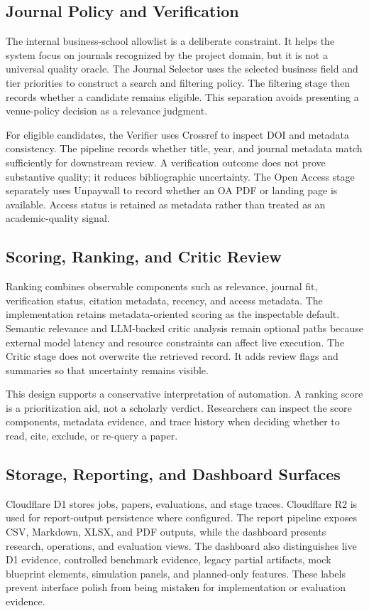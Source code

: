 \documentclass[10pt,twocolumn]{article}
\begin{document}
\subsection{Journal Policy and Verification}
The internal business-school allowlist is a deliberate constraint. It helps the system focus on journals recognized by the project domain, but it is not a universal quality oracle. The Journal Selector uses the selected business field and tier priorities to construct a search and filtering policy. The filtering stage then records whether a candidate remains eligible. This separation avoids presenting a venue-policy decision as a relevance judgment.

For eligible candidates, the Verifier uses Crossref to inspect DOI and metadata consistency. The pipeline records whether title, year, and journal metadata match sufficiently for downstream review. A verification outcome does not prove substantive quality; it reduces bibliographic uncertainty. The Open Access stage separately uses Unpaywall to record whether an OA PDF or landing page is available. Access status is retained as metadata rather than treated as an academic-quality signal.

\subsection{Scoring, Ranking, and Critic Review}
Ranking combines observable components such as relevance, journal fit, verification status, citation metadata, recency, and access metadata. The implementation retains metadata-oriented scoring as the inspectable default. Semantic relevance and LLM-backed critic analysis remain optional paths because external model latency and resource constraints can affect live execution. The Critic stage does not overwrite the retrieved record. It adds review flags and summaries so that uncertainty remains visible.

This design supports a conservative interpretation of automation. A ranking score is a prioritization aid, not a scholarly verdict. Researchers can inspect the score components, metadata evidence, and trace history when deciding whether to read, cite, exclude, or re-query a paper.

\subsection{Storage, Reporting, and Dashboard Surfaces}
Cloudflare D1 stores jobs, papers, evaluations, and stage traces. Cloudflare R2 is used for report-output persistence where configured. The report pipeline exposes CSV, Markdown, XLSX, and PDF outputs, while the dashboard presents research, operations, and evaluation views. The dashboard also distinguishes live D1 evidence, controlled benchmark evidence, legacy partial artifacts, mock blueprint elements, simulation panels, and planned-only features. These labels prevent interface polish from being mistaken for implementation or evaluation evidence.
\end{document}
